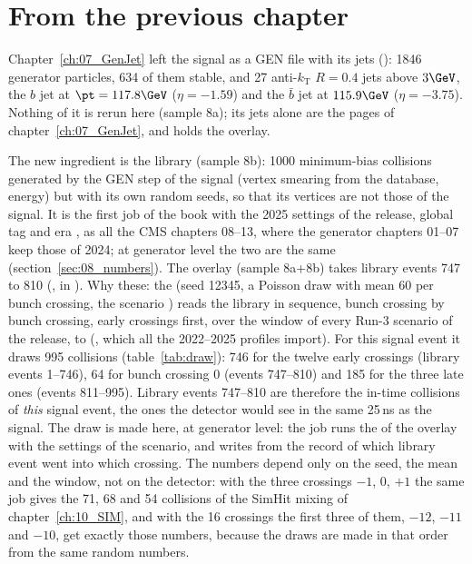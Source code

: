 \section{From the previous chapter}

Chapter~\ref{ch:07_GenJet} left the signal as a GEN file with its jets
(): 1846 generator particles, 634 of them stable,
and 27 anti-$k_{\mathrm{T}}$ $R=0.4$ jets above $3\GeV$, the $b$ jet at $\pt=117.8\GeV$ ($\eta=-1.59$) and
the $\bar b$ jet at $115.9\GeV$ ($\eta=-3.75$). Nothing of it is rerun here (sample 8a); its jets alone are
the pages of chapter~\ref{ch:07_GenJet}, and  holds the overlay.

The new ingredient is the library (sample 8b): 1000 minimum-bias collisions generated by the GEN step of the
signal (vertex smearing from the database, energy) but with its own random seeds, so that its vertices are not
those of the signal. It is the first job of the book with the 2025 settings of the release, global tag
 and era , as all the CMS chapters 08--13,
where the generator chapters 01--07 keep those of 2024; at generator level the two are the
same (section~\ref{sec:08_numbers}). The overlay (sample 8a+8b) takes library events 747 to 810 (,
 in ). Why these: the  (seed 12345, a
Poisson draw with mean 60 per bunch crossing, the scenario ) reads the library in
sequence, bunch crossing by bunch crossing, early crossings first, over the window of every Run-3 scenario
of the release,  to  (,
which all the 2022--2025 profiles import). For this signal event it draws 995 collisions
(table~\ref{tab:draw}): 746 for the twelve early crossings (library events 1--746), 64 for bunch crossing 0
(events 747--810) and 185 for the three late ones (events 811--995). Library events 747--810 are therefore the
in-time collisions of \emph{this} signal event, the ones the detector would see in the same 25\,ns as the
signal. The draw is made here, at generator level: the job  runs the
 of the overlay with the settings of the scenario, and  writes
 from the record of which library event went into which crossing. The numbers depend
only on the seed, the mean and the window, not on the detector: with the three crossings $-1$, 0, $+1$ the
same job gives the 71, 68 and 54 collisions of the SimHit mixing of chapter~\ref{ch:10_SIM}, and with the 16
crossings the first three of them, $-12$, $-11$ and $-10$, get exactly those numbers, because the draws are
made in that order from the same random numbers.

